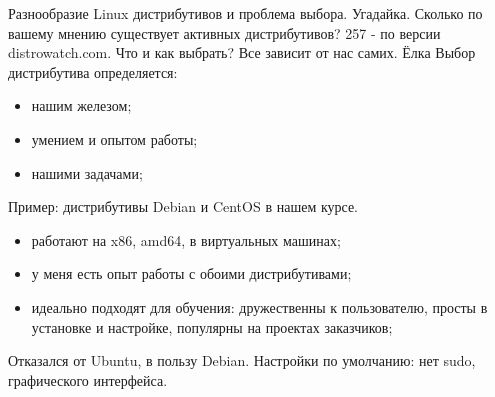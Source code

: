 \begin{frame}{Разнообразие Linux дистрибутивов и проблема выбора.}
    Угадайка. Сколько по вашему мнению существует активных дистрибутивов? 
    \pause
    \alert{257} - по версии distrowatch.com. \break 
    Что и как выбрать? \pause Все зависит от нас самих. Ёлка \break
    Выбор дистрибутива определяется:
	\begin{itemize}
            \item нашим железом;
            \item умением и опытом работы;
            \item нашими задачами;
	\end{itemize}
    Пример: дистрибутивы Debian и CentOS в нашем курсе. 
	\begin{itemize}
            \item работают на x86, amd64, в виртуальных машинах;
            \item у меня есть опыт работы с обоими дистрибутивами; 
            \item идеально подходят для обучения: дружественны к пользователю, просты в установке и настройке, популярны на проектах заказчиков;
	\end{itemize}
    Отказался от Ubuntu, в пользу Debian. Настройки по умолчанию: нет sudo, графического интерфейса.
\end{frame}
